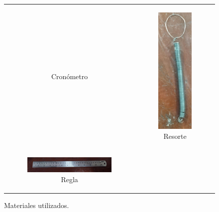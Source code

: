\documentclass[../main.tex]{subfiles}
\begin{document}
\begin{figure}[H]
\begin{tabular}{c c}
\begin{subfigure}{0.5\textwidth}
        \caption{Cronómetro}
        \label{fig:mat3}
    \end{subfigure}
    &
    \begin{subfigure}{0.5\textwidth} 
        \centering
        \includegraphics[width=0.8\linewidth,height=0.6\linewidth]{resources/mat4.jpg}
        \caption{Resorte}
        \label{fig:mat4}
    \end{subfigure}
    \\       
    \begin{subfigure}{0.5\textwidth} 
        \centering
        \includegraphics[width=0.8\linewidth,height=0.6\linewidth]{resources/mat5.jpg}
        \caption{Regla}
        \label{fig:mat5}
    \end{subfigure}
    \\
\end{tabular}
\caption{Materiales utilizados.}
\label{fig:mats}
\end{figure}
\end{document}
